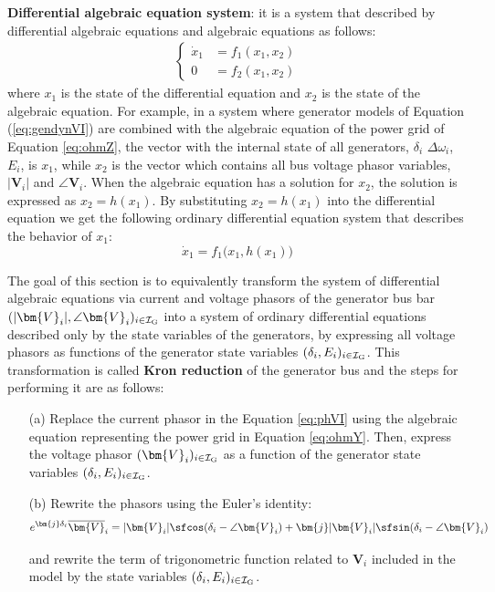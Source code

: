 \documentclass[graybox, envcountchap]{svmult}
\begin{document}
\begin{COLUMN}
\noindent \textbf{Differential algebraic equation system}:
it is a system that described by differential algebraic equations and algebraic
equations as follows:
\begin{equation}
  \begin{aligned}
    \begin{cases}
      \dot{x}_1 &= f_1(x_1,x_2) \\
      0 &= f_2(x_1,x_2)
    \end{cases}
  \end{aligned}
\end{equation}
where $x_1$ is the state of the differential equation and $x_2$ is the state of
the algebraic equation. For example, in a system where generator models of
Equation (\ref{eq:gendynVI}) are combined with the algebraic equation of the
power grid of Equation \ref{eq:ohmZ}, the vector with the internal state of all
generators, $\delta_i$ $\Delta \omega_i$, $E_i$, is $x_1$, while $x_2$ is the
vector which contains all bus voltage phasor variables, $|\bm{V}_i|$ and $\angle
\bm{V}_i$. When the algebraic equation has a solution for $x_2$, the solution is
expressed as $x_2= h(x_1)$. By substituting $x_2 = h(x_1)$ into the differential
equation we get the following ordinary differential equation system that
describes the behavior of $x_1$:
\[
  \dot{x}_1 = f_1\bigl(x_1,h(x_1) \bigr)
\]
\end{COLUMN}

The goal of this section is to equivalently transform the system of differential
algebraic equations via current and voltage phasors of the generator bus bar
$(|\bm{V}_i|, \angle \bm{V}_i)_{i\in \mathcal{I}_{\rm G}}$ into a system of
ordinary differential equations described only by the state variables of the
generators, by expressing all voltage phasors as functions of the generator
state variables $(\delta_i,E_i)_{i\in \mathcal{I}_{\rm G}}$. This transformation
is called \textbf{Kron reduction} of the generator bus and the steps for
performing it are as follows:

\medskip
\begin{breakbox} 
  \begin{itemize}
    \item[(a)] Replace the current phasor in the Equation \ref{eq:phVI} using the
    algebraic equation representing the power grid in Equation \ref{eq:ohmY}. Then,
    express the voltage phasor $(\bm{V}_i)_{i\in \mathcal{I}_{\rm G}}$ as a function
    of the generator state variables $(\delta_i,E_i)_{i\in \mathcal{I}_{\rm G}}$.

    \item[(b)] Rewrite the phasors using the Euler's identity:
    \[
      e^{\bm{j} \delta_i } \overline{\bm{V}}_i
      = |{\bm{V}_i}| \sfcos (\delta_i -\angle \bm{V}_i )
      +
      \bm{j} |{\bm{V}_i}| \sfsin (\delta_i -\angle \bm{V}_i )
    \]

    and rewrite the term of trigonometric function related to $\bm{V}_i$ included in
    the model by the state variables $(\delta_i,E_i)_{i\in \mathcal{I}_{\rm G}}$.
  \end{itemize}
\end{breakbox}
\medskip
\end{document}
